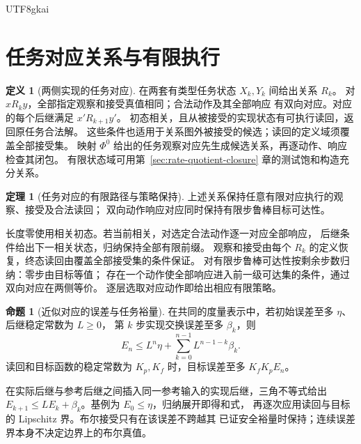 \documentclass[12pt]{report}
\makeatletter
\theoremstyle{definition}
\newtheorem{definition}{定义}[chapter]
\newtheorem{theorem}{定理}[chapter]
\newtheorem{proposition}{命题}[chapter]
\renewenvironment{proof}[1][\proofname]{\par
  \pushQED{\qed}\normalfont
  \topsep6\p@\@plus6\p@\relax
  \trivlist
  \item[\hskip\labelsep\normalfont #1\@addpunct{.}]\ignorespaces
}{
  \popQED\endtrivlist\@endpefalse
}
\makeatother
\begin{document}
\begin{CJK*}{UTF8}{gkai}
\section{任务对应关系与有限执行}
\begin{definition}[两侧实现的任务对应]
\label{def:representation-relation}
在两套有类型任务状态 \(X_k,Y_k\) 间给出关系 \(R_k\)。
对 \(xR_ky\)，全部指定观察和接受真值相同；合法动作及其全部响应
有双向对应。对应的每个后继满足 \(x'R_{k+1}y'\)。
初态相关，且从被接受的实现状态有可执行读回，返回原任务合法解。
这些条件也适用于关系图外被接受的候选；读回的定义域须覆盖全部接受集。
映射 \(\Phi^0\) 给出的任务观察对应先生成候选关系，再逐动作、响应检查其闭包。
有限状态域可用第~\ref{sec:rate-quotient-closure} 章的测试饱和构造充分关系。
\end{definition}
\begin{theorem}[任务对应的有限路径与策略保持]
\label{thm:representation-execution}
上述关系保持任意有限对应执行的观察、接受及合法读回；
双向动作响应对应同时保持有限步鲁棒目标可达性。
\end{theorem}
\begin{proof}
长度零使用相关初态。若当前相关，对选定合法动作逐一对应全部响应，
后继条件给出下一相关状态，归纳保持全部有限前缀。
观察和接受由每个 \(R_k\) 的定义恢复，终态读回由覆盖全部接受集的条件保证。
对有限步鲁棒可达性按剩余步数归纳：零步由目标等值；
存在一个动作使全部响应进入前一级可达集的条件，通过双向对应在两侧等价。
逐层选取对应动作即给出相应有限策略。
\end{proof}
\begin{proposition}[近似对应的误差与任务裕量]
\label{prop:representation-error}
在共同的度量表示中，若初始误差至多 \(\eta\)、后继稳定常数为 \(L\ge0\)，
第 \(k\) 步实现交换误差至多 \(\beta_k\)，则
\[
E_n\le L^n\eta+\sum_{k=0}^{n-1}L^{n-1-k}\beta_k.
\]
读回和目标函数的稳定常数为 \(K_p,K_f\) 时，目标误差至多 \(K_fK_pE_n\)。
\end{proposition}
\begin{proof}
在实际后继与参考后继之间插入同一参考输入的实现后继，三角不等式给出
\(E_{k+1}\le LE_k+\beta_k\)。基例为 \(E_0\le\eta\)，归纳展开即得和式，
再逐次应用读回与目标的 Lipschitz 界。布尔接受只有在该误差不跨越其
已证安全裕量时保持；连续误差界本身不决定边界上的布尔真值。
\end{proof}


\end{CJK*}
\end{document}
